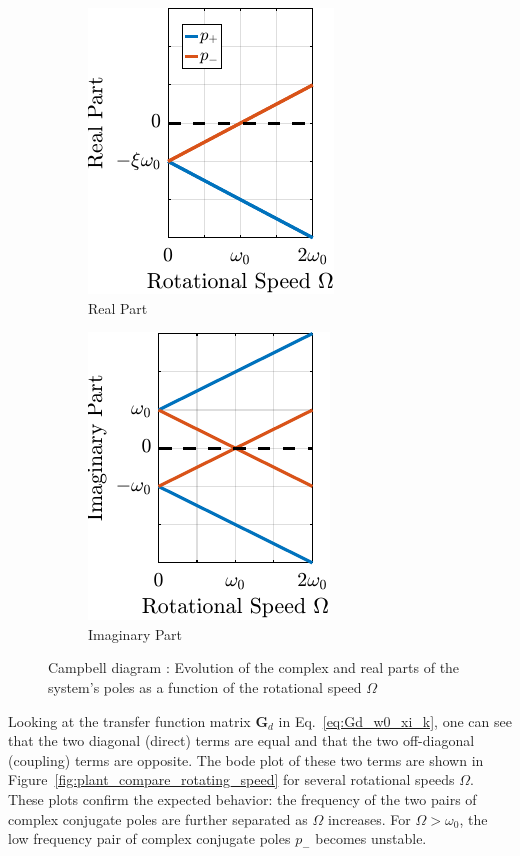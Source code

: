 \documentclass[10pt]{iopart}
\begin{document}
\begin{figure}[htbp]
\begin{subfigure}[c]{0.48\linewidth}
\centering
\includegraphics[scale=1]{figs/fig02a.pdf}
\caption{\label{fig:campbell_diagram_real} Real Part}
\end{subfigure}
\hfill
\begin{subfigure}[c]{0.48\linewidth}
\centering
\includegraphics[scale=1]{figs/fig02b.pdf}
\caption{\label{fig:campbell_diagram_imag} Imaginary Part}
\end{subfigure}
\hfill
\caption{\label{fig:campbell_diagram}Campbell diagram : Evolution of the complex and real parts of the system's poles as a function of the rotational speed \(\Omega\)}
\centering
\end{figure}

Looking at the transfer function matrix \(\mathbf{G}_d\) in Eq.~\eqref{eq:Gd_w0_xi_k}, one can see that the two diagonal (direct) terms are equal and that the two off-diagonal (coupling) terms are opposite.
The bode plot of these two terms are shown in Figure~\ref{fig:plant_compare_rotating_speed} for several rotational speeds \(\Omega\).
These plots confirm the expected behavior: the frequency of the two pairs of complex conjugate poles are further separated as \(\Omega\) increases.
For \(\Omega > \omega_0\), the low frequency pair of complex conjugate poles \(p_{-}\) becomes unstable.
\end{document}
